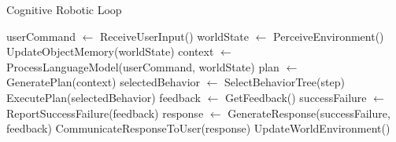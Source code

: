\documentclass{article}
\begin{document}
\begin{minipage}{0.4\textwidth}
\begin{algorithm}[H]
    \caption{Cognitive Robotic Loop}\label{algo_cognitive_loop}
    \begin{algorithmic}[1]
            \State userCommand $\gets$ ReceiveUserInput()
            \State worldState $\gets$ PerceiveEnvironment()
            \State UpdateObjectMemory(worldState)
            \State context $\gets$ ProcessLanguageModel(userCommand, worldState)
            \State plan $\gets$ GeneratePlan(context)
                \State selectedBehavior $\gets$ SelectBehaviorTree(step)
                \State ExecutePlan(selectedBehavior)
            \EndFor
            \State feedback $\gets$ GetFeedback()
            \State successFailure $\gets$ ReportSuccessFailure(feedback)
            \State response $\gets$ GenerateResponse(successFailure, feedback)
            \State CommunicateResponseToUser(response)
            \State UpdateWorldEnvironment()
        \EndWhile
    \EndProcedure
    \end{algorithmic}
\end{algorithm}
\end{minipage}
\end{document}

